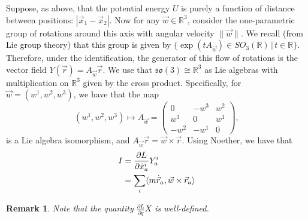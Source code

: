 \documentclass{article}
\newcommand{\R}{\mathbb R}
\newcommand{\nl}{\newline\newline\noindent}
\newcommand{\pdof}[2]{\frac{\partial #1}{\partial #2}}
\DeclarePairedDelimiter{\ang}{\langle}{\rangle}
\newtheorem{rmk}{Remark}
\begin{document}
Suppose, as above, that the potential energy $U$ is purely a function of distance between positions: $|\vec x_1 - \vec x_2|$. Now for any $\vec w\in \R^3$, consider the one-parametric group of rotations around this axis with angular velocity $\|\vec w\|$. We recall (from Lie group theory) that this group is given by $\{\exp(tA_{\vec{w}})\in SO_3(\R)\,|\,t\in\R\}$. Therefore, under the identification, the generator of this flow of rotations is the vector field $Y(\vec r) = A_{\vec{w}}\vec r$.
\nl
We use that $\mathfrak{so}(3) \cong \R^3$ as Lie algebras with multiplication on $\R^3$ given by the cross product. Specifically, for $\vec w = (w^1,w^2,w^3)$, we have that the map
\[(w^1,w^2,w^3)\mapsto A_{\vec w}=\begin{pmatrix}
    0 & -w^3 & w^2 \\
    w^3 & 0 & w^1 \\
    -w^2 & -w^1 & 0
\end{pmatrix},\]
is a Lie algebra isomorphism, and $A_{\vec w}\vec r = \vec w \times \vec r$.
\nl
Using Noether, we have that
\begin{align*}
    I &= \pdof{L}{\dot x^i_a}Y^i_a\\
    &=\sum_i\ang{m\dot{\vec r}_a,\vec w\times\vec r_a}
\end{align*}
\begin{rmk}
    Note that the quantity $\pdof{L}{\dot q} X$ is well-defined.
\end{rmk}
\end{document}
